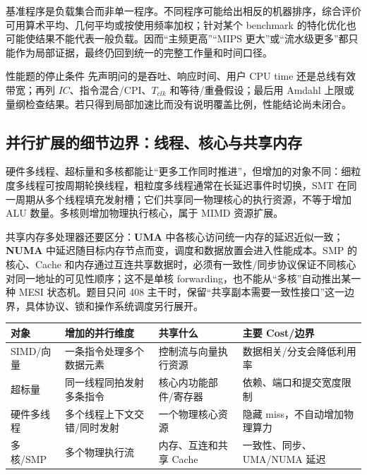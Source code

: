 \documentclass[UTF8,fontset=fandol,11pt,a4paper]{ctexart}
\newcommand{\kw}[1]{\textbf{\color{deep}#1}}
\begin{document}
基准程序是负载集合而非单一程序。不同程序可能给出相反的机器排序，综合评价可用算术平均、几何平均或按使用频率加权；针对某个 benchmark 的特化优化也可能使结果不能代表一般负载。因而“主频更高”“MIPS 更大”或“流水级更多”都只能作为局部证据，最终仍回到统一的完整工作量和时间口径。

\begin{methodbox}{性能题的停止条件}
先声明问的是吞吐、响应时间、用户 CPU time 还是总线有效带宽；再列 $IC$、指令混合/CPI、$T_{clk}$ 和等待/重叠假设；最后用 Amdahl 上限或量纲检查结果。若只得到局部加速比而没有说明覆盖比例，性能结论尚未闭合。
\end{methodbox}

\subsection{并行扩展的细节边界：线程、核心与共享内存}
硬件多线程、超标量和多核都能让“更多工作同时推进”，但增加的对象不同：细粒度多线程可按周期轮换线程，粗粒度多线程通常在长延迟事件时切换，SMT 在同一周期从多个线程填充发射槽；它们共享同一物理核心的执行资源，不等于增加 ALU 数量。多核则增加物理执行核心，属于 MIMD 资源扩展。

共享内存多处理器还要区分：\kw{UMA} 中各核心访问统一内存的延迟近似一致；\kw{NUMA} 中延迟随目标内存节点而变，调度和数据放置会进入性能成本。SMP 的核心、Cache 和内存通过互连共享数据时，必须有一致性/同步协议保证不同核心对同一地址的可见性顺序；这不是单核 forwarding，也不能从“多核”自动推出某一种 MESI 状态机。题目只问 408 主干时，保留“共享副本需要一致性接口”这一边界，具体协议、锁和操作系统调度另行展开。

\begin{center}\small
\begin{tabularx}{\linewidth}{L{2.4cm}L{3.0cm}L{3.0cm}Y}
\toprule
对象 & 增加的并行维度 & 共享什么 & 主要 Cost/边界\\\midrule
SIMD/向量 & 一条指令处理多个数据元素 & 控制流与向量执行资源 & 数据相关/分支会降低利用率\\
超标量 & 同一线程同拍发射多条指令 & 核心内功能部件/寄存器 & 依赖、端口和提交宽度限制\\
硬件多线程 & 多个线程上下文交错/同时发射 & 一个物理核心资源 & 隐藏 miss，不自动增加物理算力\\
多核/SMP & 多个物理执行流 & 内存、互连和共享 Cache & 一致性、同步、UMA/NUMA 延迟\\
\bottomrule
\end{tabularx}
\end{center}
\end{document}
